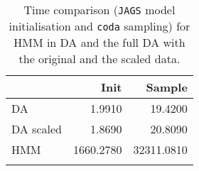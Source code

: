 \begin{table}
\begin{tabular}{l| rr}
&Init  & Sample  \\ \hline 
 DA  & 1.9910  & 19.4200  \\ 
 DA scaled  & 1.8690  & 20.8090  \\ 
 HMM  & 1660.2780  & 32311.0810  \\ 
 \\ \hline \hline
\end{tabular}
\caption{Time comparison (\texttt{JAGS} model initialisation and \texttt{coda} sampling) 
    for HMM in DA and the full DA with the original and the scaled data.}
\end{table}

